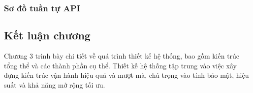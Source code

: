 




\subsubsection{Sơ đồ tuần tự API}




\subsection{Kết luận chương}

Chương 3 trình bày chi tiết về quá trình thiết kế hệ thống, bao gồm kiến trúc tổng thể và các thành phần cụ thể. 
Thiết kế hệ thống tập trung vào việc xây dựng kiến trúc vận hành hiệu quả và mượt mà, chú trọng vào tính bảo mật, hiệu suất và khả năng mở rộng tối ưu.
\newpage